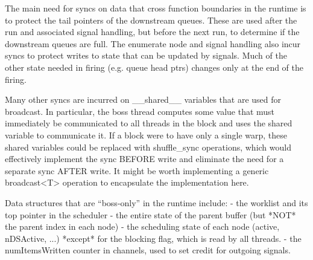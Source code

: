The main need for syncs on data that cross function boundaries in the
runtime is to protect the tail pointers of the downstream
queues. These are used after the run and associated signal handling,
but before the next run, to determine if the downstream queues are
full.  The enumerate node and signal handling also incur syncs to
protect writes to state that can be updated by signals.  Much of the
other state needed in firing (e.g. queue head ptrs) changes only at
the end of the firing.

Many other syncs are incurred on __shared__ variables that are used
for broadcast.  In particular, the boss thread computes some value
that must immediately be communicated to all threads in the block and
uses the shared variable to communicate it.  If a block were to have
only a single warp, these shared variables could be replaced with
shuffle_sync operations, which would effectively implement the sync
BEFORE write and eliminate the need for a separate sync AFTER write.
It might be worth implementing a generic broadcast<T> operation to
encapsulate the implementation here.

Data structures that are ``boss-only'' in the runtime include:
 - the worklist and its top pointer in the scheduler
 - the entire state of the parent buffer (but *NOT* the parent index
   in each node)
 - the scheduling state of each node (active, nDSActive, ...) *except*
   for the blocking flag, which is read by all threads.
 - the numItemsWritten counter in channels, used to set credit for
   outgoing signals.
